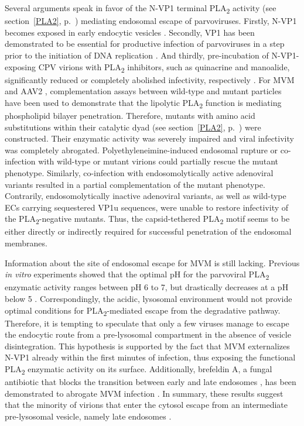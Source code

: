 Several arguments speak in favor of the N-VP1 terminal PLA\textsubscript{2} activity (see section~\ref{PLA2}, p.~\pageref{PLA2}) mediating endosomal escape of parvoviruses. Firstly, N-VP1 becomes exposed in early endocytic vesicles \cite{pmid16379002, pmid14644609, pmid9927584, pmid16284249, pmid11961250, pmid20974479, pmid11702787}. Secondly, VP1 has been demonstrated to be essential for productive infection of parvoviruses in a step prior to the initiation of DNA replication \cite{pmid8416366, pmid10684294, pmid1733094, pmid11160681, pmid11287557, pmid10644365, pmid12438589, pmid9420290}. And thirdly, pre-incubation of N-VP1-exposing CPV virions with PLA\textsubscript{2} inhibitors, such as quinacrine and manoalide, significantly reduced or completely abolished infectivity, respectively \cite{pmid14644609}. For MVM \cite{pmid16284249} and AAV2 \cite{pmid20974479}, complementation assays between wild-type and mutant particles have been used to demonstrate that the lipolytic PLA\textsubscript{2} function is mediating phospholipid bilayer penetration. Therefore, mutants with amino acid substitutions within their catalytic dyad (see section~\ref{PLA2}, p.~\pageref{PLA2}) were constructed. Their enzymatic activity was severely impaired and viral infectivity was completely abrogated. Polyethyleneimine-induced endosomal rupture or co-infection with wild-type or mutant virions could partially rescue the mutant phenotype. Similarly, co-infection with endosomolytically active adenoviral variants resulted in a partial complementation of the mutant phenotype. Contrarily, endosomolytically inactive adenoviral variants, as well as wild-type ECs carrying sequestered VP1u sequences, were unable to restore infectivity of the PLA\textsubscript{2}-negative mutants. Thus, the capsid-tethered PLA\textsubscript{2} motif seems to be either directly or indirectly required for successful penetration of the endosomal membranes.  

Information about the site of endosomal escape for MVM is still lacking. Previous \textit{in vitro} experiments showed that the optimal pH for the parvoviral PLA\textsubscript{2} enzymatic activity ranges between pH 6 to 7, but drastically decreases at a pH below 5 \cite{pmid14726513}. Correspondingly, the acidic, lysosomal environment would not provide optimal conditions for PLA\textsubscript{2}-mediated escape from the degradative pathway. Therefore, it is tempting to speculate that only a few viruses manage to escape the endocytic route from a pre-lysosomal compartment in the absence of vesicle disintegration. This hypothesis is supported by the fact that MVM externalizes N-VP1 already within the first minutes of infection, thus exposing the functional PLA\textsubscript{2} enzymatic activity on its surface. Additionally, brefeldin A, a fungal antibiotic that blocks the transition between early and late endosomes \cite{pmid1682055}, has been demonstrated to abrogate MVM infection \cite{pmid12438589}. In summary, these results suggest that the minority of virions that enter the cytosol escape from an intermediate pre-lysosomal vesicle, namely late endosomes \cite{pmid16379002}.


